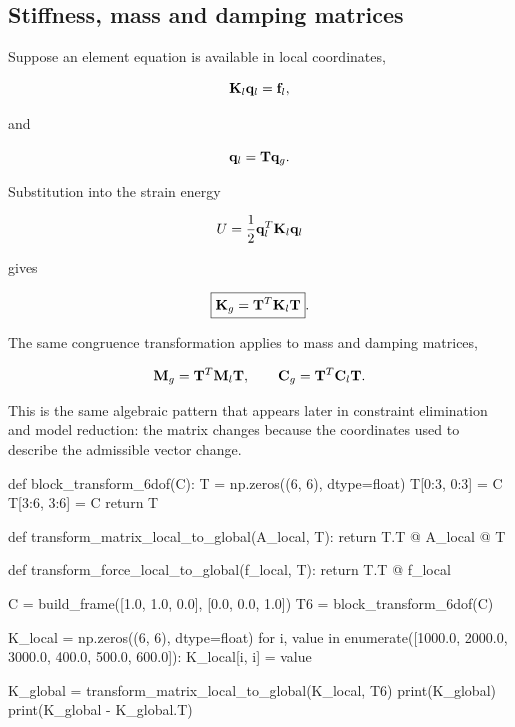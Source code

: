 \subsection{Stiffness, mass and damping matrices}

Suppose an element equation is available in local coordinates,

\begin{equation}
    \mathbf{K}_l\mathbf{q}_l=\mathbf{f}_l,
\end{equation}

and

\begin{equation}
    \mathbf{q}_l=\mathbf{T}\mathbf{q}_g.
\end{equation}

Substitution into the strain energy

\begin{equation}
    U=\frac{1}{2}\mathbf{q}_l^T\mathbf{K}_l\mathbf{q}_l
\end{equation}

gives

\begin{equation}\label{eq:coord-K-transform}
    \boxed{
    \mathbf{K}_g=\mathbf{T}^{T}\mathbf{K}_l\mathbf{T}
    }.
\end{equation}

The same congruence transformation applies to mass and damping matrices,

\begin{equation}
    \mathbf{M}_g=\mathbf{T}^{T}\mathbf{M}_l\mathbf{T},
    \qquad
    \mathbf{C}_g=\mathbf{T}^{T}\mathbf{C}_l\mathbf{T}.
\end{equation}

This is the same algebraic pattern that appears later in constraint elimination
and model reduction: the matrix changes because the coordinates used to describe
the admissible vector change.

\begin{python}
def block_transform_6dof(C):
    T = np.zeros((6, 6), dtype=float)
    T[0:3, 0:3] = C
    T[3:6, 3:6] = C
    return T


def transform_matrix_local_to_global(A_local, T):
    return T.T @ A_local @ T


def transform_force_local_to_global(f_local, T):
    return T.T @ f_local


C = build_frame([1.0, 1.0, 0.0], [0.0, 0.0, 1.0])
T6 = block_transform_6dof(C)

K_local = np.zeros((6, 6), dtype=float)
for i, value in enumerate([1000.0, 2000.0, 3000.0,
                           400.0, 500.0, 600.0]):
    K_local[i, i] = value

K_global = transform_matrix_local_to_global(K_local, T6)
print(K_global)
print(K_global - K_global.T)
\end{python}

